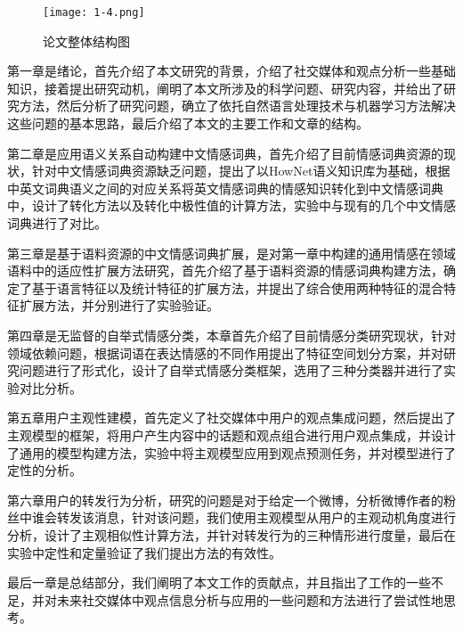 \begin{figure}[htp]
\centering
\texttt{[image: 1-4.png]}
\caption{论文整体结构图}
\label{fig1-4}
\end{figure}

第一章是绪论，首先介绍了本文研究的背景，介绍了社交媒体和观点分析一些基础知识，接着提出研究动机，阐明了本文所涉及的科学问题、研究内容，并给出了研究方法，然后分析了研究问题，确立了依托自然语言处理技术与机器学习方法解决这些问题的基本思路，最后介绍了本文的主要工作和文章的结构。

第二章是应用语义关系自动构建中文情感词典，首先介绍了目前情感词典资源的现状，针对中文情感词典资源缺乏问题，提出了以HowNet语义知识库为基础，根据中英文词典语义之间的对应关系将英文情感词典的情感知识转化到中文情感词典中，设计了转化方法以及转化中极性值的计算方法，实验中与现有的几个中文情感词典进行了对比。

第三章是基于语料资源的中文情感词典扩展，是对第一章中构建的通用情感在领域语料中的适应性扩展方法研究，首先介绍了基于语料资源的情感词典构建方法，确定了基于语言特征以及统计特征的扩展方法，并提出了综合使用两种特征的混合特征扩展方法，并分别进行了实验验证。

第四章是无监督的自举式情感分类，本章首先介绍了目前情感分类研究现状，针对领域依赖问题，根据词语在表达情感的不同作用提出了特征空间划分方案，并对研究问题进行了形式化，设计了自举式情感分类框架，选用了三种分类器并进行了实验对比分析。

第五章用户主观性建模，首先定义了社交媒体中用户的观点集成问题，然后提出了主观模型的框架，将用户产生内容中的话题和观点组合进行用户观点集成，并设计了通用的模型构建方法，实验中将主观模型应用到观点预测任务，并对模型进行了定性的分析。

第六章用户的转发行为分析，研究的问题是对于给定一个微博，分析微博作者的粉丝中谁会转发该消息，针对该问题，我们使用主观模型从用户的主观动机角度进行分析，设计了主观相似性计算方法，并针对转发行为的三种情形进行度量，最后在实验中定性和定量验证了我们提出方法的有效性。

最后一章是总结部分，我们阐明了本文工作的贡献点，并且指出了工作的一些不足，并对未来社交媒体中观点信息分析与应用的一些问题和方法进行了尝试性地思考。


\newpage 
\mbox{} 
\newpage